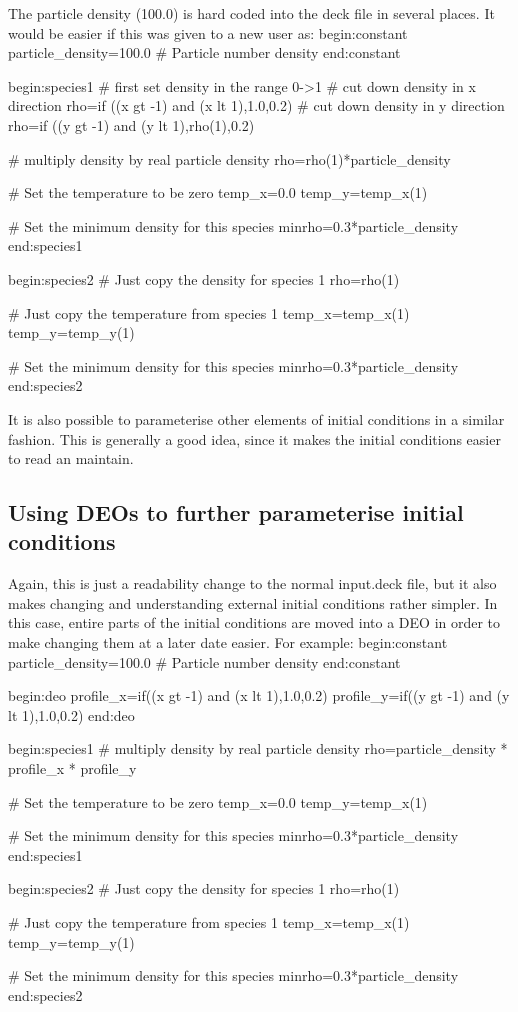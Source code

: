 \documentclass[12pt,a4paper]{article}
\newenvironment{boxverbatim}{\lboxverbatim{none}}{\endlboxverbatim}
\begin{document}
The particle density (100.0) is hard coded into the deck file in several
places. It would be easier if this was given to a new user as:
\begin{boxverbatim}
begin:constant
   particle_density=100.0 # Particle number density
end:constant

begin:species1
   # first set density in the range 0->1
   # cut down density in x direction
   rho=if ((x gt -1) and (x lt 1),1.0,0.2)
   # cut down density in y direction
   rho=if ((y gt -1) and (y lt 1),rho(1),0.2)

   # multiply density by real particle density
   rho=rho(1)*particle_density

   # Set the temperature to be zero
   temp_x=0.0
   temp_y=temp_x(1)

   # Set the minimum density for this species
   minrho=0.3*particle_density
end:species1

begin:species2
   # Just copy the density for species 1
   rho=rho(1)

   # Just copy the temperature from species 1
   temp_x=temp_x(1)
   temp_y=temp_y(1)

   # Set the minimum density for this species
   minrho=0.3*particle_density
end:species2
\end{boxverbatim}

It is also possible to parameterise other elements of initial conditions in a
similar fashion. This is generally a good idea, since it makes the
initial conditions easier to read an maintain.

\subsection{Using DEOs to further parameterise initial conditions}
Again, this is just a readability change to the normal input.deck file, but it
also makes changing and understanding external initial conditions rather
simpler. In this case, entire parts of the initial conditions are moved into a
DEO in order to make changing them at a later date easier. For example:
\begin{boxverbatim}
begin:constant
   particle_density=100.0 # Particle number density
end:constant

begin:deo
   profile_x=if((x gt -1) and (x lt 1),1.0,0.2)
   profile_y=if((y gt -1) and (y lt 1),1.0,0.2)
end:deo

begin:species1
   # multiply density by real particle density
   rho=particle_density * profile_x * profile_y

   # Set the temperature to be zero
   temp_x=0.0
   temp_y=temp_x(1)

   # Set the minimum density for this species
   minrho=0.3*particle_density
end:species1

begin:species2
   # Just copy the density for species 1
   rho=rho(1)

   # Just copy the temperature from species 1
   temp_x=temp_x(1)
   temp_y=temp_y(1)

   # Set the minimum density for this species
   minrho=0.3*particle_density
end:species2
\end{boxverbatim}
\end{document}
